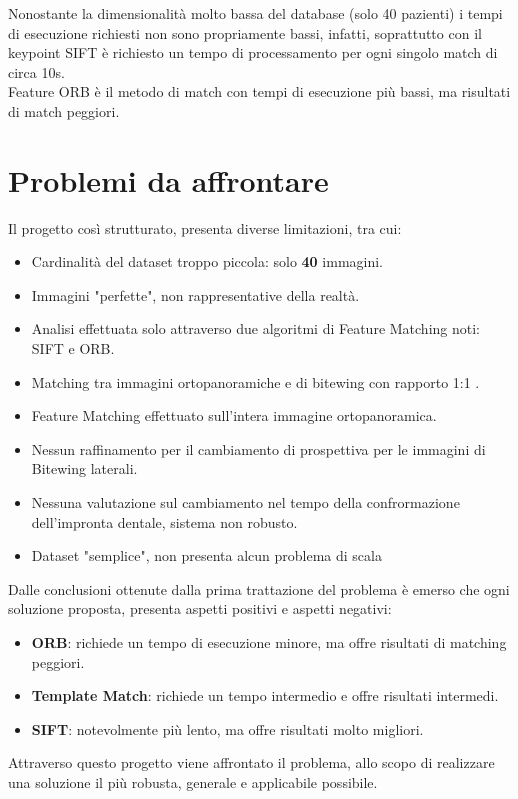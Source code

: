 \documentclass[12pt,a4paper,openright,twoside]{book}
\begin{document}
Nonostante la dimensionalità molto bassa del database (solo 40 pazienti) i tempi di esecuzione richiesti non sono propriamente bassi, infatti, soprattutto con il keypoint SIFT è richiesto un tempo di processamento per ogni singolo match di circa 10s.\\
Feature ORB è il metodo di match con tempi di esecuzione più bassi, ma risultati di match peggiori.


\section{Problemi da affrontare}
Il progetto così strutturato, presenta diverse limitazioni, tra cui:
\begin{itemize}
\item Cardinalità del dataset troppo piccola: solo \textbf{40} immagini.
\item Immagini "perfette", non rappresentative della realtà.
\item Analisi effettuata solo attraverso due algoritmi di Feature Matching noti: SIFT e ORB.
\item Matching tra  immagini ortopanoramiche e di bitewing con rapporto 1:1 .
\item Feature Matching effettuato sull'intera immagine ortopanoramica.
\item Nessun raffinamento per il cambiamento di prospettiva per le immagini di Bitewing laterali.
\item Nessuna valutazione sul cambiamento nel tempo della confrormazione dell'impronta dentale, sistema non robusto.
\item Dataset  "semplice", non presenta alcun problema di scala
\end{itemize}
Dalle conclusioni ottenute dalla prima trattazione del problema è emerso che ogni soluzione proposta, presenta aspetti positivi e aspetti negativi:
\begin{itemize}
\item \textbf{ORB}: richiede un tempo di esecuzione minore, ma offre risultati di matching peggiori.
\item \textbf{Template Match}: richiede un tempo intermedio e offre risultati intermedi.
\item \textbf{SIFT}: notevolmente più lento, ma offre risultati molto migliori.
\end{itemize}
Attraverso questo progetto viene affrontato il problema, allo scopo di realizzare una soluzione il più robusta, generale e applicabile possibile.
\end{document}
